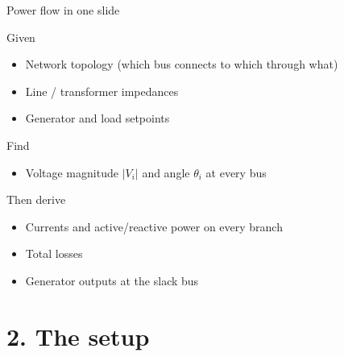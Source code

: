\documentclass[aspectratio=169,10pt]{beamer}
\begin{document}
\begin{frame}{Power flow in one slide}
\begin{block}{Given}
\begin{itemize}
  \item Network topology (which bus connects to which through what)
  \item Line / transformer impedances
  \item Generator and load setpoints
\end{itemize}
\end{block}
\begin{block}{Find}
\begin{itemize}
  \item Voltage magnitude $|V_i|$ and angle $\theta_i$ at every bus
\end{itemize}
\end{block}
\begin{block}{Then derive}
\begin{itemize}
  \item Currents and active/reactive power on every branch
  \item Total losses
  \item Generator outputs at the slack bus
\end{itemize}
\end{block}
\end{frame}

\section*{2. The setup}
\end{document}
